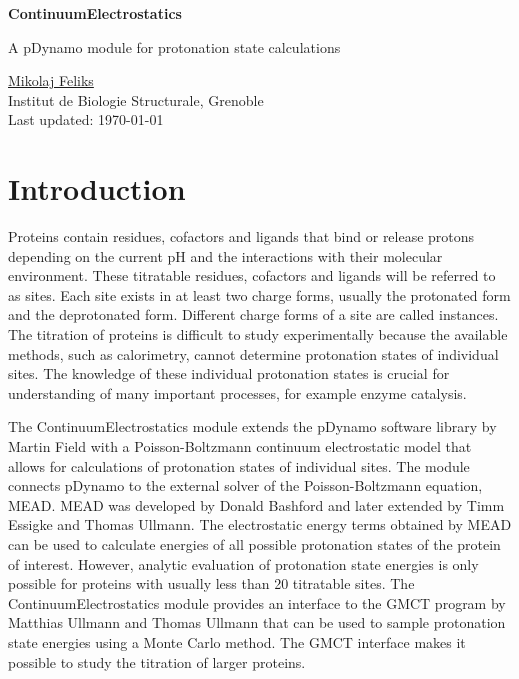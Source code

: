 \documentclass[a4paper,11pt]{article}
\newcommand{\modulename}{ContinuumElectrostatics\xspace}
\begin{document}
\begin{center}
{\LARGE \bf \modulename}

{\large
A pDynamo module for protonation state calculations

\vspace{1.0cm}
\underline{Mikolaj Feliks}\\
Institut de Biologie Structurale, Grenoble\\

Last updated: \today %
}

\vspace{0.5cm}

\end{center}


\section{Introduction}
Proteins contain residues, cofactors and ligands that bind or release protons
depending on the current pH and the interactions with their molecular
environment.
%
These titratable residues, cofactors and ligands will be referred to as sites.
%
Each site exists in at least two charge forms, usually the protonated form and 
the deprotonated form.
%
Different charge forms of a site are called instances.
%
The titration of proteins is difficult to study experimentally because
the available methods, such as calorimetry, cannot determine protonation states
of individual sites.
%
The knowledge of these individual protonation states is crucial for
understanding of many important processes, for example enzyme catalysis\cite{Bombarda2010}.


The \modulename module extends the pDynamo software library by 
Martin Field\cite{pDynamo_Field2008}  with a Poisson-Boltz\-mann continuum electrostatic 
model that allows for calculations of protonation states of individual 
sites\cite{Bashford1992,Ullmann1999,Bombarda2006}.
%
The module connects pDynamo to the external solver of the Poisson-Boltzmann 
equation, MEAD\cite{Bashford1997}.
%
MEAD was developed by Donald Bashford and 
later extended by Timm Essigke\cite{Essigke_PhD} and Thomas Ullmann\cite{Thomas_PhD}.
%
The electrostatic energy terms obtained by MEAD can be used to calculate
energies of all possible protonation states of the protein of interest.
%
However, analytic evaluation of protonation state energies is only possible
for proteins with usually less than 20 titratable sites.
%
The \modulename module provides an interface to the GMCT\cite{Ullmann2012,Thomas_PhD}
program by Matthias Ullmann and Thomas Ullmann that can be used to sample
protonation state energies using a Monte Carlo method.
%
The GMCT interface makes it possible to study the titration of larger proteins.
\end{document}

